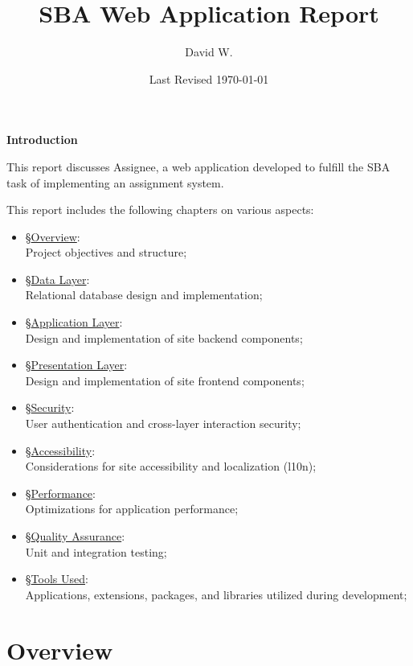 \documentclass[12pt]{report}
\title{SBA Web Application Report}
\author{David W.}
\date{Last Revised \today}
\newcommand{\n}{\par}
\newcommand{\br}{\n\vspace{1 em}\n}
\begin{document}
\maketitle

\textbf{Introduction}
\br
This report discusses Assignee, a web application developed to fulfill the SBA task of implementing an assignment system.
\br
This report includes the following chapters on various aspects:
\begin{itemize}
	\item \S \hyperref[overview]{Overview}:\\
	      Project objectives and structure;
	\item \S \hyperref[data-layer]{Data Layer}:\\
	      Relational database design and implementation;
	\item \S \hyperref[application-layer]{Application Layer}:\\
	      Design and implementation of site backend components;
	\item \S \hyperref[presentation-layer]{Presentation Layer}:\\
	      Design and implementation of site frontend components;
	\item \S \hyperref[security]{Security}:\\
	      User authentication and cross-layer interaction security;
	\item \S \hyperref[accessibility]{Accessibility}:\\
	      Considerations for site accessibility and localization (l10n);
	\item \S \hyperref[performance]{Performance}:\\
	      Optimizations for application performance;
	\item \S \hyperref[quality-assurance]{Quality Assurance}:\\
	      Unit and integration testing;
	\item \S \hyperref[tools-used]{Tools Used}:\\
	      Applications, extensions, packages, and libraries utilized during development;
\end{itemize}
\tableofcontents




\chapter{Overview} \label{overview}
\end{document}
